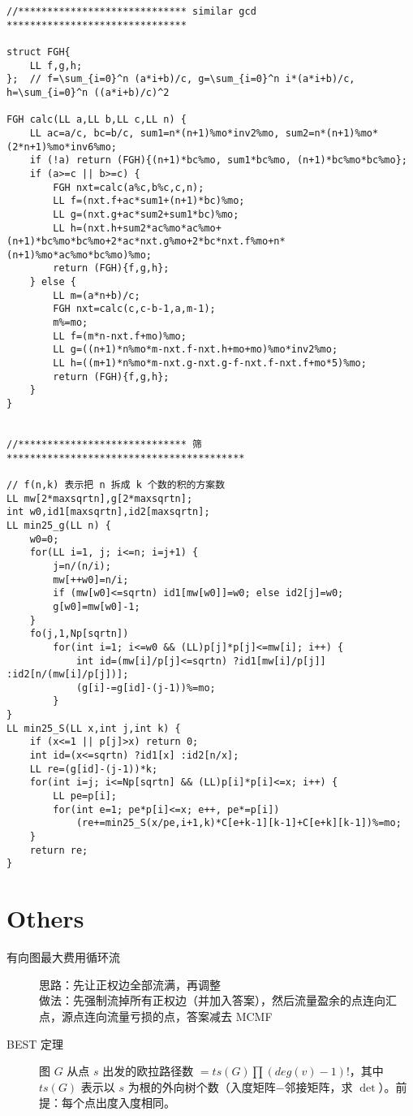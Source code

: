 \documentclass{article}
\begin{document}
\begin{multicols}{2}
\begin{lstlisting}
//***************************** similar gcd *******************************

struct FGH{
    LL f,g,h;
};  // f=\sum_{i=0}^n (a*i+b)/c, g=\sum_{i=0}^n i*(a*i+b)/c, h=\sum_{i=0}^n ((a*i+b)/c)^2

FGH calc(LL a,LL b,LL c,LL n) {
    LL ac=a/c, bc=b/c, sum1=n*(n+1)%mo*inv2%mo, sum2=n*(n+1)%mo*(2*n+1)%mo*inv6%mo;
    if (!a) return (FGH){(n+1)*bc%mo, sum1*bc%mo, (n+1)*bc%mo*bc%mo};
    if (a>=c || b>=c) {
        FGH nxt=calc(a%c,b%c,c,n);
        LL f=(nxt.f+ac*sum1+(n+1)*bc)%mo;
        LL g=(nxt.g+ac*sum2+sum1*bc)%mo;
        LL h=(nxt.h+sum2*ac%mo*ac%mo+(n+1)*bc%mo*bc%mo+2*ac*nxt.g%mo+2*bc*nxt.f%mo+n*(n+1)%mo*ac%mo*bc%mo)%mo;
        return (FGH){f,g,h};
    } else {
        LL m=(a*n+b)/c;
        FGH nxt=calc(c,c-b-1,a,m-1);
        m%=mo;
        LL f=(m*n-nxt.f+mo)%mo;
        LL g=((n+1)*n%mo*m-nxt.f-nxt.h+mo+mo)%mo*inv2%mo;
        LL h=((m+1)*n%mo*m-nxt.g-nxt.g-f-nxt.f-nxt.f+mo*5)%mo;
        return (FGH){f,g,h};
    }
}


//***************************** 筛 *****************************************

// f(n,k) 表示把 n 拆成 k 个数的积的方案数
LL mw[2*maxsqrtn],g[2*maxsqrtn];
int w0,id1[maxsqrtn],id2[maxsqrtn];
LL min25_g(LL n) {
    w0=0;
    for(LL i=1, j; i<=n; i=j+1) {
        j=n/(n/i);
        mw[++w0]=n/i;
        if (mw[w0]<=sqrtn) id1[mw[w0]]=w0; else id2[j]=w0;
        g[w0]=mw[w0]-1;
    }
    fo(j,1,Np[sqrtn])
        for(int i=1; i<=w0 && (LL)p[j]*p[j]<=mw[i]; i++) {
            int id=(mw[i]/p[j]<=sqrtn) ?id1[mw[i]/p[j]] :id2[n/(mw[i]/p[j])];
            (g[i]-=g[id]-(j-1))%=mo;
        }
}
LL min25_S(LL x,int j,int k) {
    if (x<=1 || p[j]>x) return 0;
    int id=(x<=sqrtn) ?id1[x] :id2[n/x];
    LL re=(g[id]-(j-1))*k;
    for(int i=j; i<=Np[sqrtn] && (LL)p[i]*p[i]<=x; i++) {
        LL pe=p[i];
        for(int e=1; pe*p[i]<=x; e++, pe*=p[i])
            (re+=min25_S(x/pe,i+1,k)*C[e+k-1][k-1]+C[e+k][k-1])%=mo;
    }
    return re;
}
\end{lstlisting}

\section{Others}

\begin{description}
  \item[有向图最大费用循环流] 思路：先让正权边全部流满，再调整 \\
      做法：先强制流掉所有正权边（并加入答案），然后流量盈余的点连向汇点，源点连向流量亏损的点，答案减去 MCMF
  \item[BEST 定理] 图 $G$ 从点 $s$ 出发的欧拉路径数 $= ts(G) \prod (deg(v)-1)!$，其中 $ts(G)$ 表示以 $s$ 为根的外向树个数（入度矩阵$-$邻接矩阵，求 $\det$）。前提：每个点出度入度相同。
\end{description}


\end{multicols}
\end{document}

